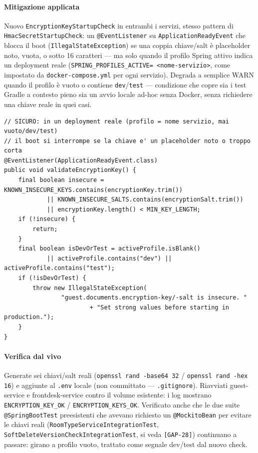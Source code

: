 ﻿\documentclass[a4paper,12pt]{report}
\newcommand{\threat}[1]{\texttt{\small\textcolor{vulnred}{[#1]}}}
\begin{document}
\paragraph{Mitigazione applicata}
Nuovo \texttt{EncryptionKeyStartupCheck} in entrambi i servizi, stesso
pattern di \texttt{HmacSecretStartupCheck}: un \texttt{@EventListener} su
\texttt{ApplicationReadyEvent} che blocca il boot
(\texttt{IllegalStateException}) se una coppia chiave/salt è placeholder
noto, vuota, o sotto 16 caratteri --- ma solo quando il profilo Spring
attivo indica un deployment reale (\texttt{SPRING\_PROFILES\_ACTIVE=
<nome-servizio>}, come impostato da \texttt{docker-compose.yml} per ogni
servizio). Degrada a semplice WARN quando il profilo è vuoto o contiene
\texttt{dev}/\texttt{test} --- condizione che copre sia i test Gradle a
contesto pieno sia un avvio locale ad-hoc senza Docker, senza richiedere
una chiave reale in quei casi.

\begin{securebox}[title={EncryptionKeyStartupCheck.java (guest-service) --- fail-closed in produzione (fix)}]
\begin{lstlisting}[style=java]
// SICURO: in un deployment reale (profilo = nome servizio, mai vuoto/dev/test)
// il boot si interrompe se la chiave e' un placeholder noto o troppo corta
@EventListener(ApplicationReadyEvent.class)
public void validateEncryptionKey() {
    final boolean insecure = KNOWN_INSECURE_KEYS.contains(encryptionKey.trim())
            || KNOWN_INSECURE_SALTS.contains(encryptionSalt.trim())
            || encryptionKey.length() < MIN_KEY_LENGTH;
    if (!insecure) {
        return;
    }
    final boolean isDevOrTest = activeProfile.isBlank()
            || activeProfile.contains("dev") || activeProfile.contains("test");
    if (!isDevOrTest) {
        throw new IllegalStateException(
                "guest.documents.encryption-key/-salt is insecure. "
                        + "Set strong values before starting in production.");
    }
}
\end{lstlisting}
\end{securebox}

\paragraph{Verifica dal vivo}
Generate sei chiavi/salt reali (\texttt{openssl rand -base64 32} /
\texttt{openssl rand -hex 16}) e aggiunte al \texttt{.env} locale (non
committato --- \texttt{.gitignore}). Riavviati guest-service e
frontdesk-service contro il volume esistente: i log mostrano
\texttt{ENCRYPTION\_KEY\_OK} / \texttt{ENCRYPTION\_KEYS\_OK}. Verificato
anche che le due suite \texttt{@SpringBootTest} preesistenti che avevano
richiesto un \texttt{@MockitoBean} per evitare le chiavi reali
(\texttt{RoomTypeServiceIntegrationTest},
\texttt{SoftDeleteVersionCheckIntegrationTest}, si veda \threat{GAP-28})
continuano a passare: girano a profilo vuoto, trattato come segnale
dev/test dal nuovo check.
\end{document}
